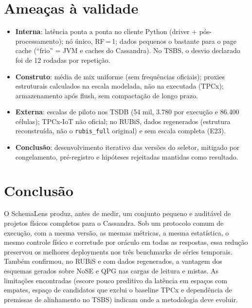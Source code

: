 \documentclass[10pt,a4paper,twoside]{article}
\theoremstyle{definition}\newtheorem{definicao}{Definição}
\begin{document}
\section{Ameaças à validade}
\begin{itemize}
\item \textbf{Interna}: latência ponta a ponta no cliente Python (driver + pós-processamento); nó único, RF\,=\,1; dados pequenos o bastante para o page cache (``frio'' = JVM e caches do Cassandra). No TSBS, o desvio declarado foi de 12 rodadas por repetição.
\item \textbf{Construto}: média de mix uniforme (sem frequências oficiais); proxies estruturais calculados na escala modelada, não na executada (TPCx); armazenamento após flush, sem compactação de longo prazo.
\item \textbf{Externa}: escalas de piloto nos TSDB (54 mil, 3.780 por execução e 86.400 células); TPCx-IoT não oficial; no RUBiS, dados regenerados (estrutura reconstruída, não o \texttt{rubis\_full} original) e sem escala completa (E23).
\item \textbf{Conclusão}: desenvolvimento iterativo das versões do seletor, mitigado por congelamento, pré-registro e hipóteses rejeitadas mantidas como resultado.
\end{itemize}

\section{Conclusão}
O SchemaLens produz, antes de medir, um conjunto pequeno e auditável de projetos físicos completos para o Cassandra. Sob um protocolo comum de execução, com a mesma versão, as mesmas métricas, a mesma estatística, o mesmo controle físico e corretude por oráculo em todas as respostas, essa redução preservou os melhores deployments nos três benchmarks de séries temporais. Também confirmou, no RUBiS e com dados regenerados, a vantagem dos esquemas gerados sobre NoSE e QPG nas cargas de leitura e mistas. As limitações encontradas (escore pouco preditivo da latência em espaços com empates, espaço de candidatos que exclui o baseline TPCx e dependência de premissas de alinhamento no TSBS) indicam onde a metodologia deve evoluir.
\end{document}
